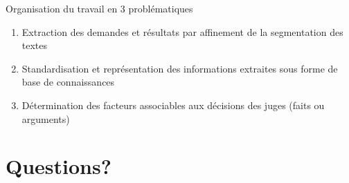 \documentclass[newPxFont,pagenumber]{beamer}
\begin{document}
\begin{frame}{Organisation du travail en 3 problématiques}

\begin{enumerate}
\setlength\itemsep{1.5em}
\item Extraction des demandes et résultats par affinement de la segmentation des textes
\item Standardisation et représentation des informations extraites sous forme de base de connaissances
\item Détermination des facteurs associables aux décisions des juges (faits ou arguments)

\end{enumerate}

\end{frame}

\section{Questions?}
\end{document}
